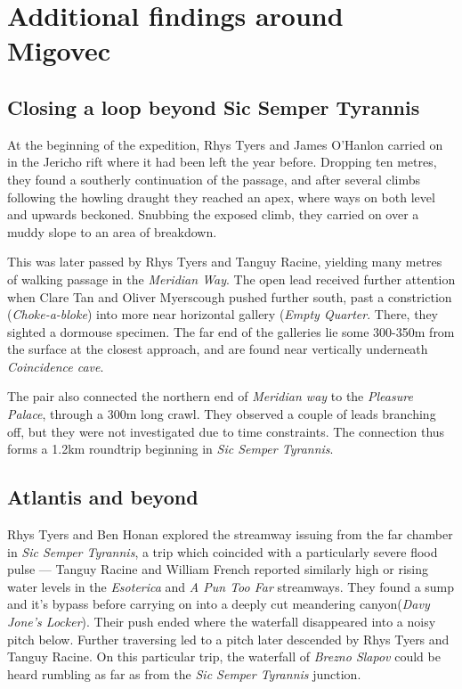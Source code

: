 \section{Additional findings around Migovec}

\subsection{Closing a loop beyond Sic Semper Tyrannis}
At the beginning of the expedition, Rhys Tyers and James O'Hanlon carried on in the Jericho rift where it had been left the year before. Dropping ten metres, they found a southerly continuation of the passage, and after several climbs following the howling draught they reached an apex, where ways on both level and upwards beckoned. Snubbing the exposed climb, they carried on over a muddy slope to an area of breakdown. 

This was later passed by Rhys Tyers and Tanguy Racine, yielding many metres of walking passage in the \emph{Meridian Way}. The open lead received further attention when Clare Tan and Oliver Myerscough pushed further south, past a constriction (\emph{Choke-a-bloke}) into more near horizontal gallery (\emph{Empty Quarter}. There, they sighted a dormouse specimen. The far end of the galleries lie some 300-350m from the surface at the closest approach, and are found near vertically underneath \emph{Coincidence cave}.

The pair also connected the northern end of \emph{Meridian way} to the \emph{Pleasure Palace}, through a 300m long crawl. They observed a couple of leads branching off, but they were not investigated due to time constraints. The connection thus forms a 1.2km roundtrip beginning in \emph{Sic Semper Tyrannis}.

\subsection{Atlantis and beyond}
Rhys Tyers and Ben Honan explored the streamway issuing from the far chamber in \emph{Sic Semper Tyrannis}, a trip which coincided with a particularly severe flood pulse --- Tanguy Racine and William French reported similarly high or rising water levels in the \emph{Esoterica} and \emph{A Pun Too Far} streamways. They found a sump and it's bypass before carrying on into a deeply cut meandering canyon(\emph{Davy Jone's Locker}). Their push ended where the waterfall disappeared into a noisy pitch below. Further traversing led to a pitch later descended by Rhys Tyers and Tanguy Racine. On this particular trip, the waterfall of \emph{Brezno Slapov} could be heard rumbling as far as from the \emph{Sic Semper Tyrannis} junction. 

